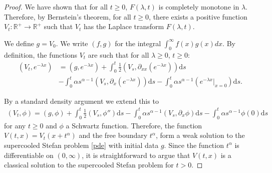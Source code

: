 \documentclass[10pt,a4paper]{amsart}
\begin{document}
\begin{proof}
We have shown that for all $t\geq 0$, $F(\lambda,t)$ is completely monotone in $\lambda$. Therefore, by Bernstein's theorem, for all $t\geq 0$, there exists a positive function $V_t:\mathbb{R}^+\rightarrow \mathbb{R^+}$ such that $V_t$ has the Laplace transform $F(\lambda,t)$. 

We define $g=V_0$. We write $(f,g)$ for the integral $\int_0^\infty f(x)g(x)dx$.  
By definition, the functions $V_t$ are such that for all $\lambda\geq 0$, $t\geq 0$:
\begin{align*}
    (V_t,e^{-\lambda x})&=(g,e^{-\lambda x})+\int_0^t\frac{1}{2}(V_s,\partial_{xx}\left(e^{-\lambda x}\right))\textrm{d}s\\&-\int_0^t\alpha s^{\alpha-1}(V_s,\partial_x\left(e^{-\lambda x}\right))\textrm{d}s-\int_0^t\alpha s^{\alpha -1}(e^{-\lambda x}|_{x=0})\textrm{d}s.
\end{align*}

By a standard density argument we extend this to 
\begin{align*}
    (V_t,\phi)=(g,\phi)+\int_0^t\frac{1}{2}(V_s,\phi'')\textrm{d}s-\int_0^t\alpha s^{\alpha-1}(V_s,\partial_x\phi)\textrm{d}s-\int_0^t\alpha s^{\alpha -1}\phi(0)\textrm{d}s
\end{align*}
for any $t\geq 0$ and $\phi$ a Schwartz function. Therefore, the function $V(t,x)=V_t(x+t^\alpha)$ and the free boundary $t^\alpha$, form a weak solution to the supercooled Stefan problem \eqref{pde} with initial data $g$. Since the function $t^\alpha$ is differentiable on $(0,\infty)$, it is straightforward to argue that $V(t,x)$ is a classical solution to the supercooled Stefan problem for $t>0$.
\end{proof}
\end{document}
